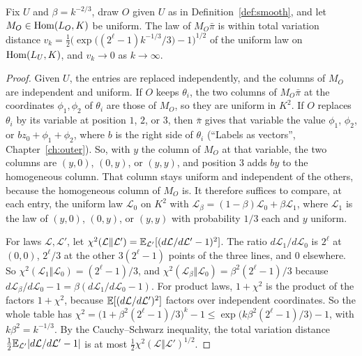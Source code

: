 \begin{lemma}\label{lem:tv}
Fix $U$ and $\beta=k^{-2/3}$, draw $O$ given $U$ as in Definition~\ref{def:smooth}, and let $M_O\in\operatorname{Hom}(L_O,K)$ be uniform. The law of $M_O\bar\pi$ is within total variation distance $v_k=\tfrac12\bigl(\exp\bigl((2^\ell-1)k^{-1/3}/3\bigr)-1\bigr)^{1/2}$ of the uniform law on $\operatorname{Hom}(L_U,K)$, and $v_k\to0$ as $k\to\infty$.
\end{lemma}

\begin{proof}
Given $U$, the entries are replaced independently, and the columns of $M_O$ are independent and uniform. If $O$ keeps $\theta_i$, the two columns of $M_O\bar\pi$ at the coordinates $\phi_1,\phi_2$ of $\theta_i$ are those of $M_O$, so they are uniform in $K^2$. If $O$ replaces $\theta_i$ by its variable at position $1$, $2$, or $3$, then $\bar\pi$ gives that variable the value $\phi_1$, $\phi_2$, or $bz_0+\phi_1+\phi_2$, where $b$ is the right side of $\theta_i$ (``Labels as vectors'', Chapter~\ref{ch:outer}). So, with $y$ the column of $M_O$ at that variable, the two columns are $(y,0)$, $(0,y)$, or $(y,y)$, and position $3$ adds $by$ to the homogeneous column. That column stays uniform and independent of the others, because the homogeneous column of $M_O$ is. It therefore suffices to compare, at each entry, the uniform law $\mathcal L_0$ on $K^2$ with $\mathcal L_\beta=(1-\beta)\mathcal L_0+\beta\mathcal L_1$, where $\mathcal L_1$ is the law of $(y,0)$, $(0,y)$, or $(y,y)$ with probability $1/3$ each and $y$ uniform.

For laws $\mathcal L,\mathcal L'$, let $\chi^2(\mathcal L\Vert\mathcal L')=\mathbb{E}_{\mathcal L'}[(d\mathcal L/d\mathcal L'-1)^2]$. The ratio $d\mathcal L_1/d\mathcal L_0$ is $2^\ell$ at $(0,0)$, $2^\ell/3$ at the other $3(2^\ell-1)$ points of the three lines, and $0$ elsewhere. So $\chi^2(\mathcal L_1\Vert\mathcal L_0)=(2^\ell-1)/3$, and $\chi^2(\mathcal L_\beta\Vert\mathcal L_0)=\beta^2(2^\ell-1)/3$ because $d\mathcal L_\beta/d\mathcal L_0-1=\beta(d\mathcal L_1/d\mathcal L_0-1)$. For product laws, $1+\chi^2$ is the product of the factors $1+\chi^2$, because $\mathbb{E}[(d\mathcal L/d\mathcal L')^2]$ factors over independent coordinates. So the whole table has $\chi^2=\bigl(1+\beta^2(2^\ell-1)/3\bigr)^k-1\le\exp\bigl(k\beta^2(2^\ell-1)/3\bigr)-1$, with $k\beta^2=k^{-1/3}$. By the Cauchy--Schwarz inequality, the total variation distance $\tfrac12\mathbb{E}_{\mathcal L'}|d\mathcal L/d\mathcal L'-1|$ is at most $\tfrac12\chi^2(\mathcal L\Vert\mathcal L')^{1/2}$.
\end{proof}


